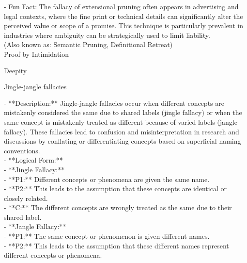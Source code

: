 \documentclass[a4paper,12pt,single,pdftex]{scrbook}
\begin{document}
    
      - Fun Fact: The fallacy of extensional pruning often appears in advertising and legal contexts, where the fine print or technical details can significantly alter the perceived value or scope of a promise. This technique is particularly prevalent in industries where ambiguity can be strategically used to limit liability.
    \\

  
    
      (Also known as: Semantic Pruning, Definitional Retreat)
    \\

  

Proof by Intimidation

Deepity

Jingle-jangle fallacies
    
      - **Description:** Jingle-jangle fallacies occur when different concepts are mistakenly considered the same due to shared labels (jingle fallacy) or when the same concept is mistakenly treated as different because of varied labels (jangle fallacy). These fallacies lead to confusion and misinterpretation in research and discussions by conflating or differentiating concepts based on superficial naming conventions.
    \\

    
      - **Logical Form:**
    \\

    
        - **Jingle Fallacy:**
    \\

    
          - **P1:** Different concepts or phenomena are given the same name.
    \\

    
          - **P2:** This leads to the assumption that these concepts are identical or closely related.
    \\

    
          - **C:** The different concepts are wrongly treated as the same due to their shared label.
    \\

    
        - **Jangle Fallacy:**
    \\

    
          - **P1:** The same concept or phenomenon is given different names.
    \\

    
          - **P2:** This leads to the assumption that these different names represent different concepts or phenomena.
    \\
\end{document}
